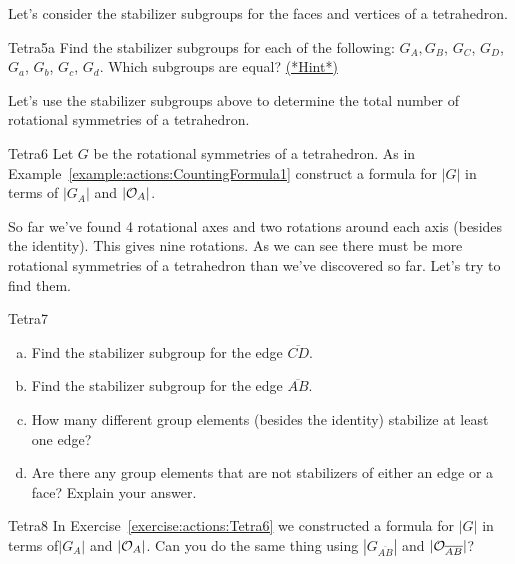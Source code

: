 Let's consider the stabilizer subgroups for the faces and vertices of a tetrahedron. 

\begin{exercise}{Tetra5a}
Find the stabilizer subgroups for each of the following:
$G_{A},  G_{B}$, $G_{C}$, $G_{D}$, $G_{a}$, $G_{b}$, $G_{c}$, $G_{d}$. Which subgroups are equal?
\hyperref[sec:actions:hints]{(*Hint*)}
\end{exercise}

Let's use the stabilizer subgroups above to determine the total number of rotational symmetries of a tetrahedron.  

\begin{exercise}{Tetra6} 
Let $G$ be the rotational symmetries of a tetrahedron.  As in Example~\ref{example:actions:CountingFormula1} construct a formula for $|G|$ in terms of $| G_{A}|$ and $|{\cal O}_{A}|$.  \end {exercise}
So far we've found 4 rotational axes and two rotations around each axis (besides the identity). This gives nine rotations.  As we can see there must be more rotational symmetries of a tetrahedron than we've discovered so far.  Let's try to find them. 

\begin{exercise}{Tetra7}
\begin{enumerate}[(a)]
\item Find the stabilizer subgroup for the edge $\overline{CD}$. 
\item Find the stabilizer subgroup for the edge $\overline{AB}$.
\item How many different group elements (besides the identity) stabilize at least one edge?
\item Are there any group elements that are not stabilizers of either an edge or a face?  Explain your answer.
\end{enumerate}
\end{exercise}	

\begin{exercise}{Tetra8}
In Exercise~\ref{exercise:actions:Tetra6} we constructed a formula for $|G|$ in terms of$| G_{A}|$ and $|{\cal O}_{A}|$.  Can you do the same thing using $| G_{\overline{AB}}|$ and $|{\cal O}_{\overline{AB}}|$?
\end{exercise}

